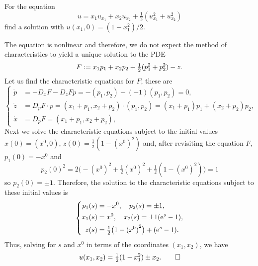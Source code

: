 \begin{problem}
  For the equation
  \[
    u=x_1u_{x_1}+x_2u_{x_2}+\tfrac{1}{2}(u_{x_1}^2+u_{x_2}^2)
  \]
  find a solution with \(u(x_1,0)=(1-x_1^2)/2\).
\end{problem}
\begin{solution*}
  The equation is nonlinear and therefore, we do not expect the method of
  characteristics to yield a unique solution to the PDE
  \[
    F\defeq x_1p_1+x_2p_2+\tfrac{1}{2}(p_1^2+p_2^2)-z.
  \]
  Let us find the characteristic equations for \(F\); these are
  \[
    \left\{
      \begin{aligned}
        \dot p&=-D_xF-D_zFp=-(p_1,p_2)-(-1)(p_1,p_2)=0,\\
        \dot z&=D_pF\cdot p=(x_1+p_1,x_2+p_2)\cdot
                (p_1,p_2)=(x_1+p_1)p_1+(x_2+p_2)p_2,\\
        \dot x&=D_pF=(x_1+p_1,x_2+p_2),
      \end{aligned}
    \right.
  \]
  Next we solve the characteristic equations subject to the initial values
  \(x(0)=(x^0,0)\), \(z(0)=\tfrac{1}{2}(1-{(x^0)}^2)\) and, after
  revisiting the equation \(F\), \(p_1(0)=-x^0\) and
  \[
    p_2(0)^2=
    2\bigl(-{(x^0)}^2+\tfrac{1}{2}{(x^0)}^2+\tfrac{1}{2}(1-{(x^0)}^2)\bigr)=1
  \]
  so \(p_2(0)=\pm 1\). Therefore, the solution to the characteristic
  equations subject to these initial values is
  \[
    \left\{
      \begin{aligned}
        p_1(s)&=-x^0,\quad p_2(s)=\pm 1,\\
        x_1(s)&=x^0,\quad x_2(s)=\pm 1(\mathrm{e}^s-1),\\
        z(s)&=\tfrac{1}{2}\bigl(1-{(x^0)}^2\bigr)+(\mathrm{e}^s-1).
      \end{aligned}
    \right.
  \]
  Thus, solving for \(s\) and \(x^0\) in terms of the coordinates
  \((x_1,x_2)\), we have
  \[
    u(x_1,x_2)=\tfrac{1}{2}(1-x_1^2)\pm x_2.\qedhere
  \]
\end{solution*}

